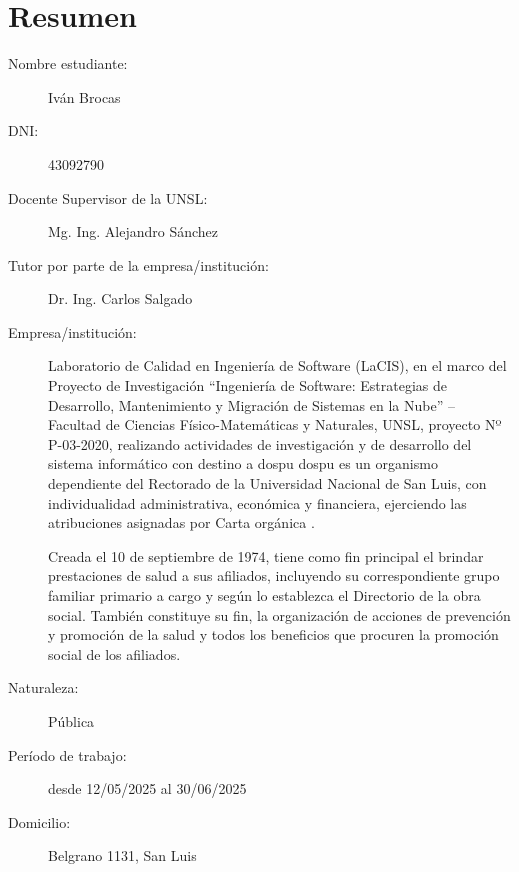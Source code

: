 \section{Resumen}

\begin{description}
    \item[Nombre estudiante:] Iván Brocas
    \item[DNI:] 43092790
    \item[Docente Supervisor de la UNSL:] Mg. Ing. Alejandro Sánchez
    \item[Tutor por parte de la empresa/institución:] Dr. Ing. Carlos Salgado
    \item[Empresa/institución:] 
    Laboratorio de Calidad en Ingeniería de Software (LaCIS), en el marco del Proyecto de Investigación ``Ingeniería de Software: Estrategias de Desarrollo, Mantenimiento y Migración de Sistemas en la Nube'' – Facultad de Ciencias Físico-Matemáticas y Naturales, UNSL, proyecto Nº P-03-2020, realizando actividades de investigación y de desarrollo del sistema informático con destino a \acrfull{dospu}
    \acrshort{dospu} es un organismo dependiente del Rectorado de la Universidad Nacional de San Luis, con individualidad administrativa, económica y financiera, ejerciendo las atribuciones asignadas por Carta orgánica \cite{CSOrd53}.

    Creada el 10 de septiembre de 1974, tiene como fin principal el brindar prestaciones de salud a sus afiliados, incluyendo su correspondiente grupo familiar primario a cargo y según lo establezca el Directorio de la obra social. También constituye su fin, la organización de acciones de prevención y promoción de la salud y todos los beneficios que procuren la promoción social de los afiliados. 
    \item[Naturaleza:] Pública
    \item[Período de trabajo:] desde 12/05/2025 al 30/06/2025
    \item[Domicilio:] Belgrano 1131, San Luis 
\end{description}

